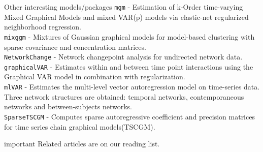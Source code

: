 \documentclass[dvipsnames,aspectratio=169]{beamer} %
\newcommand{\cL}{\mathcal{L}}
\renewcommand{\P}{\mathbb{P}}
\begin{document}
%

%
%

\begin{frame}{Other interesting models/packages}
\texttt{mgm} - Estimation of k-Order time-varying Mixed Graphical Models and mixed VAR(p) models via elastic-net regularized neighborhood regression.\\[.2cm]
	\texttt{mixggm} - Mixtures of Gaussian graphical models for model-based clustering with sparse covariance and concentration matrices.\\[.2cm]
	\texttt{NetworkChange} - Network changepoint analysis for undirected network data.\\[.2cm]
	\texttt{graphicalVAR} - Estimates within and between time point interactions  using the Graphical VAR model in combination with regularization.\\[.2cm]
	\texttt{mlVAR} - Estimates the multi-level vector autoregression model on time-series data. Three network structures are obtained: temporal networks, contemporaneous networks and between-subjects networks.\\[.2cm]

\texttt{SparseTSCGM} - Computes sparse autoregressive coefficient and precision matrices for time series chain graphical models(TSCGM).\\[.3cm]
	\begin{beamercolorbox}[wd=\paperwidth,sep=5pt]{important}
	Related articles are on our reading list.	
	\end{beamercolorbox}

\end{frame}
\end{document}
